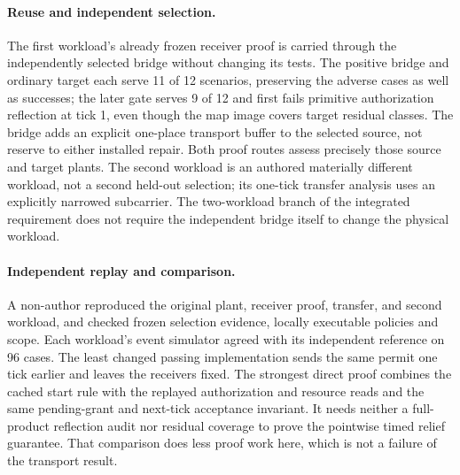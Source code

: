 \documentclass[11pt]{article}
\begin{document}
\paragraph{Reuse and independent selection.} The first workload's
already frozen receiver proof is carried through the independently
selected bridge without changing its tests. The positive bridge and
ordinary target each serve 11 of 12 scenarios, preserving the adverse
cases as well as successes; the later gate serves 9 of 12 and first
fails primitive authorization reflection at tick 1, even though the
map image covers target residual classes. The bridge adds an explicit
one-place transport buffer to the selected source, not reserve to
either installed repair. Both proof routes assess precisely those
source and target plants. The second workload is an authored
materially different workload, not a second held-out selection; its
one-tick transfer analysis uses an explicitly narrowed subcarrier.
The two-workload branch of the integrated requirement does not
require the independent bridge itself to change the physical workload.

\paragraph{Independent replay and comparison.} A non-author reproduced
the original plant, receiver proof, transfer, and second workload, and
checked frozen selection evidence, locally executable policies and
scope. Each workload's event simulator agreed with its independent
reference on 96 cases. The least changed passing implementation sends
the same permit one tick earlier and leaves the receivers fixed. The
strongest direct proof combines the cached start rule with the
replayed authorization and resource reads and the same pending-grant
and next-tick acceptance invariant. It needs neither a full-product
reflection audit nor residual coverage to prove the pointwise timed
relief guarantee. That comparison does less proof work here, which is
not a failure of the transport result.
\end{document}
